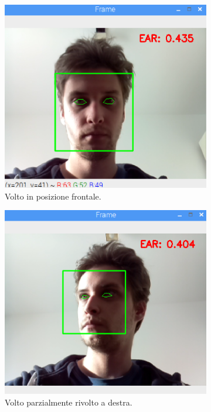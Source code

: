 \documentclass[12pt]{article}
\begin{document}
\begin{figure}[!htb]
	\begin{subfigure}{.3\textwidth}
		\centering
		\includegraphics[width=.8\linewidth]{eps/mp_straight_view.eps}
		\caption{Volto in posizione frontale.}
	\end{subfigure}
	\hspace{5mm}
	\begin{subfigure}{.3\textwidth}
		\centering
		\includegraphics[width=.8\linewidth]{eps/mp_right_view.eps}
		\caption{Volto parzialmente rivolto a destra.}
	\end{subfigure}
	\hspace{5mm}
	\begin{subfigure}{.3\textwidth}
		\centering

\end{subfigure}
\end{figure}
\end{document}
